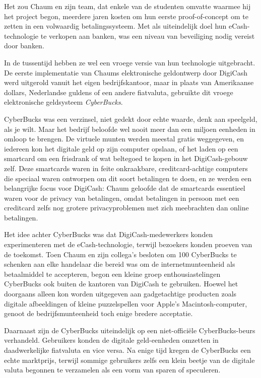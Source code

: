 \documentclass[
  a5paper,
  smalldemyvopaper,11pt,twoside,onecolumn,openright,extrafontsizes,
hidelinks]{memoir}
\begin{document}
Het zou Chaum en zijn team, dat enkele van de studenten omvatte waarmee
hij het project begon, meerdere jaren kosten om hun eerste
proof-of-concept om te zetten in een volwaardig betalingssysteem. Met
als uiteindelijk doel hun eCash-technologie te verkopen aan banken, was
een niveau van beveiliging nodig vereist door banken.

In de tussentijd hebben ze wel een vroege versie van hun technologie
uitgebracht. De eerste implementatie van Chaums elektronische
geldontwerp door DigiCash werd uitgerold vanuit het eigen
bedrijfskantoor, maar in plaats van Amerikaanse dollars, Nederlandse
guldens of een andere fiatvaluta, gebruikte dit vroege elektronische
geldsysteem \emph{CyberBucks}.

CyberBucks was een verzinsel, niet gedekt door echte waarde, denk aan
speelgeld, als je wilt. Maar het bedrijf beloofde wel nooit meer dan een
miljoen eenheden in omloop te brengen. De virtuele munten werden meestal
gratis weggegeven, en iedereen kon het digitale geld op zijn computer
opslaan, of het laden op een smartcard om een frisdrank of wat beltegoed
te kopen in het DigiCash-gebouw zelf. Deze smartcards waren in feite
onkraakbare, creditcard-achtige computers die speciaal waren ontworpen
om dit soort betalingen te doen, en ze werden een belangrijke focus voor
DigiCash: Chaum geloofde dat de smartcards essentieel waren voor de
privacy van betalingen, omdat betalingen in persoon met een creditcard
zelfs nog grotere privacyproblemen met zich meebrachten dan online
betalingen.

Het idee achter CyberBucks was dat DigiCash-medewerkers konden
experimenteren met de eCash-technologie, terwijl bezoekers konden
proeven van de toekomst. Toen Chaum en zijn collega's besloten om 100
CyberBucks te schenken aan elke handelaar die bereid was om de
internetmunteenheid als betaalmiddel te accepteren, begon een kleine
groep enthousiastelingen CyberBucks ook buiten de kantoren van DigiCash
te gebruiken. Hoewel het doorgaans alleen kon worden uitgegeven aan
gadgetachtige producten zoals digitale afbeeldingen of kleine
puzzelspellen voor Apple's Macintosh-computer, genoot de
bedrijfsmunteenheid toch enige bredere acceptatie.

Daarnaast zijn de CyberBucks uiteindelijk op een niet-officiële
CyberBucks-beurs verhandeld. Gebruikers konden de digitale geld-eenheden
omzetten in daadwerkelijke fiatvaluta en vice versa. Na enige tijd
kregen de CyberBucks een echte marktprijs, terwijl sommige gebruikers
zelfs een klein beetje van de digitale valuta begonnen te verzamelen als
een vorm van sparen of speculeren.
\end{document}
